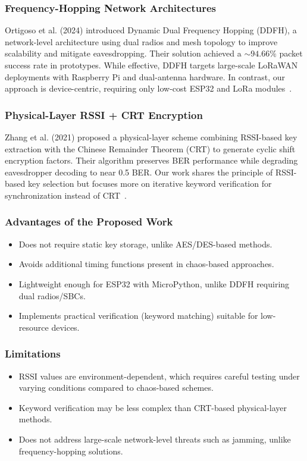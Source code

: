 \subsubsection{Frequency-Hopping Network Architectures}
    Ortigoso et al. (2024) introduced Dynamic Dual Frequency Hopping (DDFH), a network-level architecture using dual radios and mesh topology to improve scalability and mitigate eavesdropping. Their solution achieved a $\sim 94.66\%$ packet success rate in prototypes. While effective, DDFH targets large-scale LoRaWAN deployments with Raspberry Pi and dual-antenna hardware. In contrast, our approach is device-centric, requiring only low-cost ESP32 and LoRa modules~\cite{ortigoso2024ddfh}.

\subsubsection{Physical-Layer RSSI + CRT Encryption}
Zhang et al. (2021) proposed a physical-layer scheme combining RSSI-based key extraction with the Chinese Remainder Theorem (CRT) to generate cyclic shift encryption factors. Their algorithm preserves BER performance while degrading eavesdropper decoding to near 0.5 BER. Our work shares the principle of RSSI-based key selection but focuses more on iterative keyword verification for synchronization instead of CRT~\cite{zhang2021physical}.

\subsubsection{Advantages of the Proposed Work}
\begin{itemize}
    \item Does not require static key storage, unlike AES/DES-based methods.
    \item Avoids additional timing functions present in chaos-based approaches.
    \item Lightweight enough for ESP32 with MicroPython, unlike DDFH requiring dual radios/SBCs.
    \item Implements practical verification (keyword matching) suitable for low-resource devices.
\end{itemize}

\subsubsection{Limitations}
\begin{itemize}
    \item RSSI values are environment-dependent, which requires careful testing under varying conditions compared to chaos-based schemes.
    \item Keyword verification may be less complex than CRT-based physical-layer methods.
    \item Does not address large-scale network-level threats such as jamming, unlike frequency-hopping solutions.
\end{itemize}

